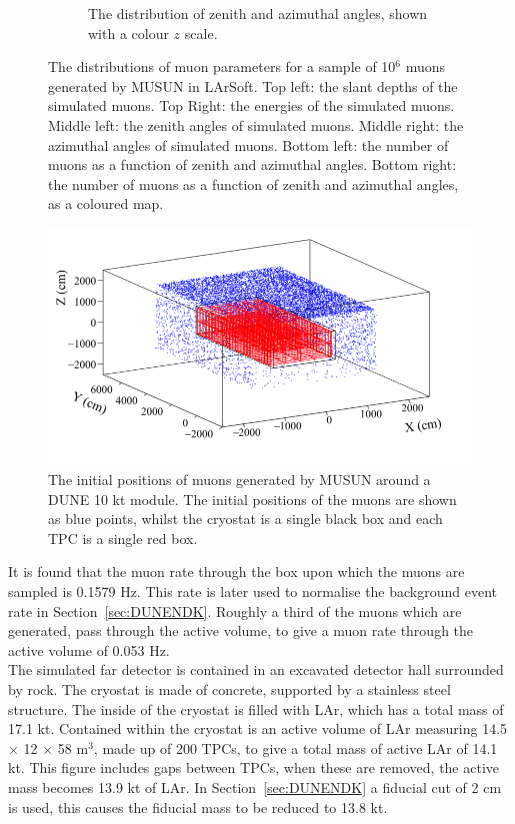 \begin{figure}
\begin{subfigure}{0.45\textwidth}
    \caption{The distribution of zenith and azimuthal angles, shown with a colour $z$ scale.}
  \end{subfigure}
  \caption[The distributions of muon parameters for a sample of 10$^6$ muons generated by MUSUN in LArSoft]
          {The distributions of muon parameters for a sample of 10$^6$ muons generated by MUSUN in LArSoft. Top left: the slant depths of the simulated muons. Top Right: the energies of the simulated muons. Middle left: the zenith angles of simulated muons. Middle right: the azimuthal angles of simulated muons. Bottom left: the number of muons as a function of zenith and azimuthal angles. Bottom right: the number of muons as a function of zenith and azimuthal angles, as a coloured map.}
  \label{fig:MUSUNIncorp}
\end{figure}

\begin{figure}
  \centering
  \includegraphics[width=\textwidth]{MuonPosCan}
  \caption[The initial positions of muons generated by MUSUN around a DUNE 10 kt module]
          {The initial positions of muons generated by MUSUN around a DUNE 10 kt module. The initial positions of the muons are shown as blue points, whilst the cryostat is a single black box and each TPC is a single red box.}
  \label{fig:10ktPos}
\end{figure}

It is found that the muon rate through the box upon which the muons are sampled is 0.1579 Hz. This rate is later used to normalise the background event rate in Section~\ref{sec:DUNENDK}. Roughly a third of the muons which are generated, pass through the active volume, to give a muon rate through the active volume of 0.053 Hz. \\ 

The simulated far detector is contained in an excavated detector hall surrounded by rock. The cryostat is made of concrete, supported by a stainless steel structure. The inside of the cryostat is filled with LAr, which has a total mass of 17.1 kt. Contained within the cryostat is an active volume of LAr measuring 14.5 $\times$ 12 $\times$ 58 m$^{3}$, made up of 200 TPCs, to give a total mass of active LAr of 14.1 kt. This figure includes gaps between TPCs, when these are removed, the active mass becomes 13.9 kt of LAr. In Section~\ref{sec:DUNENDK} a fiducial cut of 2 cm is used, this causes the fiducial mass to be reduced to 13.8 kt. \\ 

